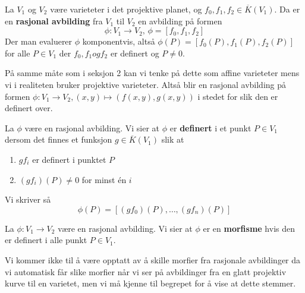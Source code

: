 \begin{definisjon}
La $V_1$ og $V_2$ være varieteter i det projektive planet, og $f_0, f_1, f_2 \in \overline{K}(V_1)$.  Da er en \textbf{rasjonal avbilding} fra $V_1$ til $V_2$ en avbilding på formen $$ \phi: V_1 \rightarrow V_2 \text{, } \phi = [f_0, f_1, f_2] $$ 
Der man evaluerer $\phi$ komponentvis, altså $\phi(P) = [f_0(P), f_1(P), f_2(P)]$ for alle $P \in V_1$ der $f_0, f_1 og f_2$ er definert og $P \neq 0$.
\end{definisjon}

På samme måte som i seksjon 2 kan vi tenke på dette som affine varieteter mens vi i realiteten bruker projektive varieteter. Altså blir en rasjonal avbilding på formen $\phi: V_1 \rightarrow V_2, (x,y) \mapsto (f(x,y), g(x,y))$ i stedet for slik den er definert over.


\begin{definisjon}
La $\phi$ være en rasjonal avbilding. Vi sier at $\phi$ er \textbf{definert} i et punkt $P \in V_1$ dersom det finnes et funksjon $g \in \overline{K}(V_1)$ slik at
\begin{enumerate}[noitemsep]
    \item $g f_i$ er definert i punktet $P$
    \item $(gf_i)(P) \neq 0$ for minst én $i$
\end{enumerate}
Vi skriver så $$ \phi(P) = [(gf_0)(P), \ldots, (gf_n)(P)] $$
\end{definisjon}

\begin{definisjon}
La $\phi: V_1 \rightarrow V_2$ være en rasjonal avbilding. Vi sier at $\phi$ er en \textbf{morfisme} hvis den er definert i alle punkt $P \in V_1$.
\end{definisjon}

Vi kommer ikke til å være opptatt av å skille morfier fra rasjonale avbildinger da vi automatisk får slike morfier når vi ser på avbildinger fra en glatt projektiv kurve til en varietet, men vi må kjenne til begrepet for å vise at dette stemmer.

